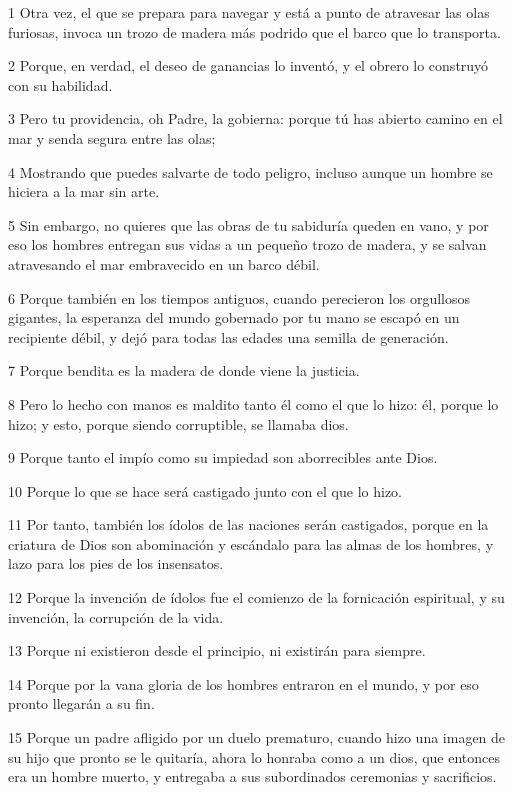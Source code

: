\par 1 Otra vez, el que se prepara para navegar y está a punto de atravesar las olas furiosas, invoca un trozo de madera más podrido que el barco que lo transporta.
\par 2 Porque, en verdad, el deseo de ganancias lo inventó, y el obrero lo construyó con su habilidad.
\par 3 Pero tu providencia, oh Padre, la gobierna: porque tú has abierto camino en el mar y senda segura entre las olas;
\par 4 Mostrando que puedes salvarte de todo peligro, incluso aunque un hombre se hiciera a la mar sin arte.
\par 5 Sin embargo, no quieres que las obras de tu sabiduría queden en vano, y por eso los hombres entregan sus vidas a un pequeño trozo de madera, y se salvan atravesando el mar embravecido en un barco débil.
\par 6 Porque también en los tiempos antiguos, cuando perecieron los orgullosos gigantes, la esperanza del mundo gobernado por tu mano se escapó en un recipiente débil, y dejó para todas las edades una semilla de generación.
\par 7 Porque bendita es la madera de donde viene la justicia.
\par 8 Pero lo hecho con manos es maldito tanto él como el que lo hizo: él, porque lo hizo; y esto, porque siendo corruptible, se llamaba dios.
\par 9 Porque tanto el impío como su impiedad son aborrecibles ante Dios.
\par 10 Porque lo que se hace será castigado junto con el que lo hizo.
\par 11 Por tanto, también los ídolos de las naciones serán castigados, porque en la criatura de Dios son abominación y escándalo para las almas de los hombres, y lazo para los pies de los insensatos.
\par 12 Porque la invención de ídolos fue el comienzo de la fornicación espiritual, y su invención, la corrupción de la vida.
\par 13 Porque ni existieron desde el principio, ni existirán para siempre.
\par 14 Porque por la vana gloria de los hombres entraron en el mundo, y por eso pronto llegarán a su fin.
\par 15 Porque un padre afligido por un duelo prematuro, cuando hizo una imagen de su hijo que pronto se le quitaría, ahora lo honraba como a un dios, que entonces era un hombre muerto, y entregaba a sus subordinados ceremonias y sacrificios.
